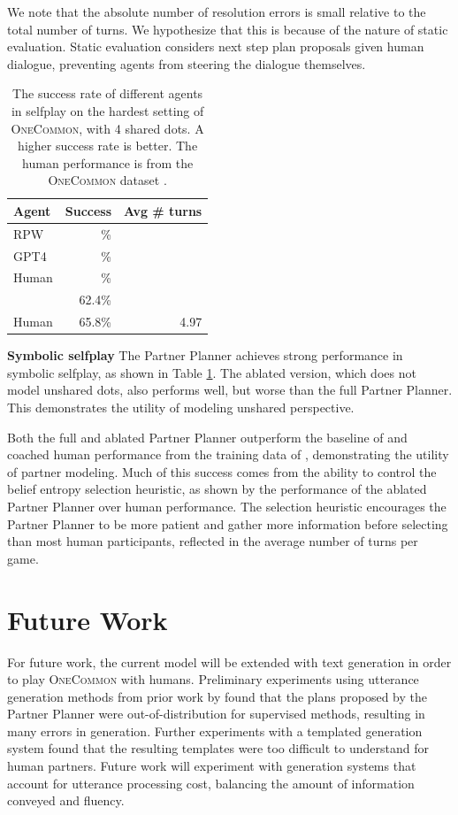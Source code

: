 \documentclass[11pt]{article}
\newcommand{\system}{RPW}
\begin{document}
We note that the absolute number of resolution errors is small relative to the total number of turns.
We hypothesize that this is because of the nature of static evaluation.
Static evaluation considers next step plan proposals given human dialogue,
preventing agents from steering the dialogue themselves.

\begin{table}[!t]
\centering
\begin{tabular}{lrr}
\toprule
Agent                   & Success & Avg \# turns\\
\midrule
\system{}               & \%        & \\
GPT4                    & \%  & \\
Human                   & \%  & \\
\citet{fried}           & 62.4\%  & \\
Human                   & 65.8\%  & 4.97\\
\bottomrule
\end{tabular}
\caption{\label{tbl:selfplay}
The success rate of different agents in selfplay on the hardest setting of \textsc{OneCommon}, with 4 shared dots.
A higher success rate is better.
The human performance is from the \textsc{OneCommon} dataset
\citep{onecommon}.
}
\end{table}

\textbf{Symbolic selfplay}
The Partner Planner achieves strong performance in symbolic selfplay, as shown in Table \ref{tbl:selfplay}.
The ablated version, which does not model unshared dots, also performs well, but worse than the full Partner Planner.
This demonstrates the utility of modeling unshared perspective.

Both the full and ablated Partner Planner outperform the baseline of \citet{fried} and coached human performance from the training data of \citet{onecommon}, demonstrating the utility of partner modeling.
Much of this success comes from the ability to control the
belief entropy selection heuristic, as shown by the performance of the ablated Partner Planner over human performance.
The selection heuristic encourages the Partner Planner to be more patient and gather more information before selecting than most human participants,
reflected in the average number of turns per game.

\section{Future Work}
For future work, the current model will be extended with text generation in order to play \textsc{OneCommon} with humans.
Preliminary experiments using utterance generation methods from prior work by \citet{fried} found that the plans proposed by the Partner Planner were out-of-distribution for supervised methods, resulting in many errors in generation.
Further experiments with a templated generation system found that the resulting templates were too difficult to understand for human partners.
Future work will experiment with generation systems that account for utterance processing cost, balancing the amount of information conveyed and fluency.
\end{document}
